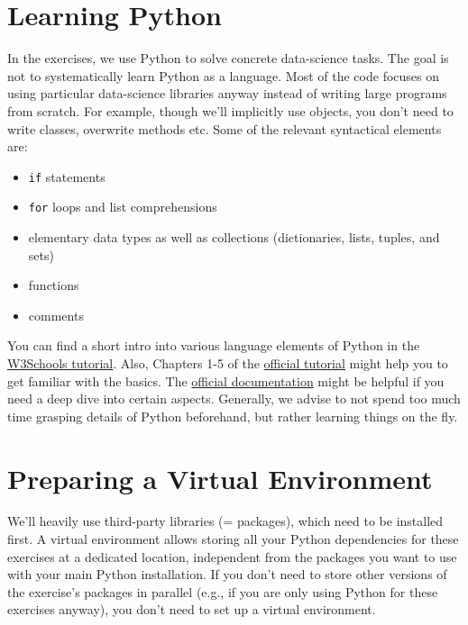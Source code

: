 \documentclass[12pt]{article}
\newcommand{\code}[1]{{\color{kitgreen}\texttt{#1}}}
\begin{document}
\section{Learning Python}

In the exercises, we use Python to solve concrete data-science tasks.
The goal is not to systematically learn Python as a language.
Most of the code focuses on using particular data-science libraries anyway instead of writing large programs from scratch.
For example, though we'll implicitly use objects, you don't need to write classes, overwrite methods etc.
Some of the relevant syntactical elements are:

\begin{itemize}[left=0pt, noitemsep]
	\item \code{if} statements
	\item \code{for} loops and list comprehensions
	\item elementary data types as well as collections (dictionaries, lists, tuples, and sets)
	\item functions
	\item comments
\end{itemize}

You can find a short intro into various language elements of Python in the \href{https://www.w3schools.com/python/default.asp}{W3Schools tutorial}.
Also, Chapters 1-5 of the \href{https://docs.python.org/3.8/tutorial/index.html}{official tutorial} might help you to get familiar with the basics.
The \href{https://docs.python.org/3.8/}{official documentation} might be helpful if you need a deep dive into certain aspects.
Generally, we advise to not spend too much time grasping details of Python beforehand, but rather learning things on the fly.

\section{Preparing a Virtual Environment}
\label{sec:environment}

We'll heavily use third-party libraries (= packages), which need to be installed first.
A virtual environment allows storing all your Python dependencies for these exercises at a dedicated location, independent from the packages you want to use with your main Python installation.
If you don't need to store other versions of the exercise's packages in parallel (e.g., if you are only using Python for these exercises anyway), you don't need to set up a virtual environment.
\end{document}
